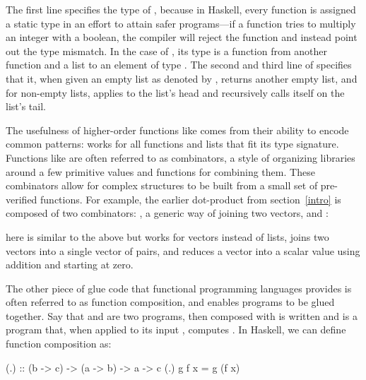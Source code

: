 \documentclass[../paper.tex]{subfiles}
\begin{document}
The first line specifies the type of , because in Haskell, every function is assigned a static type in an effort to attain safer programs---if a function tries to multiply an integer with a boolean, the compiler will reject the function and instead point out the type mismatch. In the case of , its type is a function from another function  and a list  to an element of type . The second and third line of  specifies that it, when given an empty list as denoted by \codei{[]}, returns another empty list, and for non-empty lists, applies  to the list's head and recursively calls itself on the list's tail.

The usefulness of higher-order functions like  comes from their ability to encode common patterns:  works for all functions and lists that fit its type signature. Functions like  are often referred to as combinators, a style of organizing libraries around a few primitive values and functions for combining them. These combinators allow for complex structures to be built from a small set of pre-verified functions. For example, the earlier dot-product from section~\ref{intro} is composed of two combinators: , a generic way of joining two vectors, and :


\noindent {} here is similar to the above  but works for vectors instead of lists,  joins two vectors into a single vector of pairs, and  reduces a vector into a scalar value using addition and starting at zero.

The other piece of glue code that functional programming languages provides is often referred to as function composition, and enables programs to be glued together. Say that  and  are two programs, then  composed with  is written  and is a program that, when applied to its input , computes . In Haskell, we can define function composition as:

\begin{code}
(.) :: (b -> c) -> (a -> b) -> a -> c
(.) g f x = g (f x)
\end{code}
\end{document}
